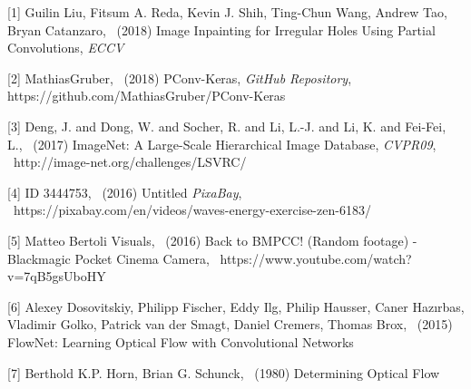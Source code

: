 \documentclass{article}
\begin{document}
[1] Guilin Liu, Fitsum A. Reda, Kevin J. Shih, Ting-Chun Wang, Andrew Tao, Bryan Catanzaro, \ (2018) Image Inpainting for Irregular Holes Using Partial Convolutions, {\it ECCV }

[2] MathiasGruber, \ (2018) PConv-Keras, {\it GitHub Repository}, \ \\https://github.com/MathiasGruber/PConv-Keras

[3] Deng, J. and Dong, W. and Socher, R. and Li, L.-J. and Li, K. and Fei-Fei, L., \ (2017) ImageNet: A Large-Scale Hierarchical Image Database, {\it CVPR09}, \ http://image-net.org/challenges/LSVRC/

[4] ID 3444753, \ (2016) Untitled {\it PixaBay}, \ https://pixabay.com/en/videos/waves-energy-exercise-zen-6183/

[5] Matteo Bertoli Visuals, \ (2016) Back to BMPCC! (Random footage) - Blackmagic Pocket Cinema Camera, \ https://www.youtube.com/watch?v=7qB5gsUboHY

[6] Alexey Dosovitskiy, Philipp Fischer, Eddy Ilg, Philip Hausser, Caner Hazırbas, Vladimir Golko, Patrick van der Smagt, Daniel Cremers, Thomas Brox, \ (2015) FlowNet: Learning Optical Flow with Convolutional Networks

[7] Berthold K.P. Horn, Brian G. Schunck, \ (1980) Determining Optical Flow
\end{document}
